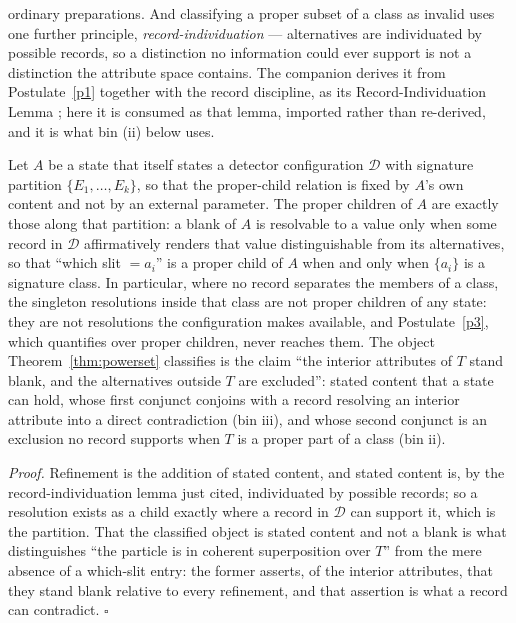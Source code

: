 ordinary preparations. And classifying a proper subset of a class as invalid uses one further principle, \emph{record-individuation} --- alternatives are individuated by possible records, so a distinction no information could ever support is not a distinction the attribute space contains. The companion derives it from Postulate~\ref{p1} together with the record discipline, as its Record-Individuation Lemma \cite{Aethus}; here it is consumed as that lemma, imported rather than re-derived, and it is what bin (ii) below uses.

\begin{lemma}\label{lem:children} Let $A$ be a state that itself states a detector configuration $\mathcal{D}$ with signature partition $\{E_1,\ldots,E_k\}$, so that the proper-child relation is fixed by $A$'s own content and not by an external parameter. The proper children of $A$ are exactly those along that partition: a blank of $A$ is resolvable to a value only when some record in $\mathcal{D}$ affirmatively renders that value distinguishable from its alternatives, so that ``which slit $= a_i$'' is a proper child of $A$ when and only when $\{a_i\}$ is a signature class. In particular, where no record separates the members of a class, the singleton resolutions inside that class are not proper children of any state: they are not resolutions the configuration makes available, and Postulate~\ref{p3}, which quantifies over proper children, never reaches them. The object Theorem~\ref{thm:powerset} classifies is the claim ``the interior attributes of $T$ stand blank, and the alternatives outside $T$ are excluded'': stated content that a state can hold, whose first conjunct conjoins with a record resolving an interior attribute into a direct contradiction (bin iii), and whose second conjunct is an exclusion no record supports when $T$ is a proper part of a class (bin ii).
\end{lemma}
\noindent\textit{Proof.} Refinement is the addition of stated content, and stated content is, by the record-individuation lemma just cited, individuated by possible records; so a resolution exists as a child exactly where a record in $\mathcal{D}$ can support it, which is the partition. That the classified object is stated content and not a blank is what distinguishes ``the particle is in coherent superposition over $T$'' from the mere absence of a which-slit entry: the former asserts, of the interior attributes, that they stand blank relative to every refinement, and that assertion is what a record can contradict. \hfill$\square$

